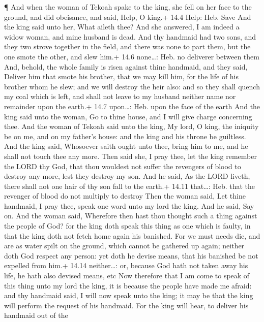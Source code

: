  ¶ And when the woman of Tekoah spake to the king, she fell
on her face to the ground, and did obeisance, and said, Help, O king.+
14.4 Help: Heb. Save  And the king said unto her, What
aileth thee? And she answered, I am indeed a widow woman, and mine
husband is dead.  And thy handmaid had two sons, and they
two strove together in the field, and there was none to part them, but
the one smote the other, and slew him.+ 14.6 none\ldots: Heb. no
deliverer between them  And, behold, the whole family is
risen against thine handmaid, and they said, Deliver him that smote his
brother, that we may kill him, for the life of his brother whom he slew;
and we will destroy the heir also: and so they shall quench my coal
which is left, and shall not leave to my husband neither name nor
remainder upon the earth.+ 14.7 upon\ldots: Heb. upon the face of the
earth  And the king said unto the woman, Go to thine house,
and I will give charge concerning thee.  And the woman of
Tekoah said unto the king, My lord, O king, the iniquity be on me, and
on my father's house: and the king and his throne be guiltless.
 And the king said, Whosoever saith ought unto thee, bring
him to me, and he shall not touch thee any more.  Then said
she, I pray thee, let the king remember the LORD thy God, that thou
wouldest not suffer the revengers of blood to destroy any more, lest
they destroy my son. And he said, As the LORD liveth, there shall not
one hair of thy son fall to the earth.+ 14.11 that\ldots: Heb. that the
revenger of blood do not multiply to destroy  Then the
woman said, Let thine handmaid, I pray thee, speak one word unto my lord
the king. And he said, Say on.  And the woman said,
Wherefore then hast thou thought such a thing against the people of God?
for the king doth speak this thing as one which is faulty, in that the
king doth not fetch home again his banished.  For we must
needs die, and are as water spilt on the ground, which cannot be
gathered up again; neither doth God respect any person: yet doth he
devise means, that his banished be not expelled from him.+ 14.14
neither\ldots: or, because God hath not taken away his life, he hath
also devised means, etc  Now therefore that I am come to
speak of this thing unto my lord the king, it is because the people have
made me afraid: and thy handmaid said, I will now speak unto the king;
it may be that the king will perform the request of his handmaid.
 For the king will hear, to deliver his handmaid out of the
